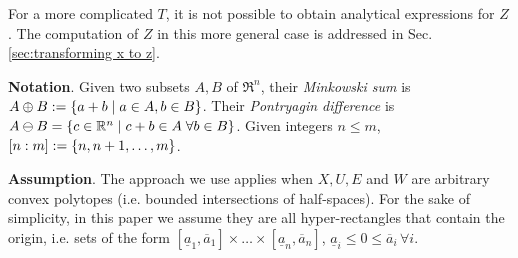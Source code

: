 For a more complicated $T$, it is not possible to obtain analytical expressions for $Z$. 
The computation of $Z$ in this more general case is addressed in Sec. \ref{sec:transforming x to z}.

\textbf{Notation}.
Given two subsets $A,B$ of $\Re^n$, their \textit{Minkowski sum} is $A\oplus B := \{a+b \;|\; a\in A, b\in B\}$.
Their \emph{Pontryagin difference} is $A\ominus B = \{c \in \mathbb{R}^n \;|\; c+b \in A\; \forall b \in B\}$.
Given integers $n \leq m$, $[n:m] := \{n,n+1,\ldots,m\}$.

\textbf{Assumption}. 
The approach we use applies when $X, U, E$ and $W$ are arbitrary convex polytopes (i.e. bounded intersections of half-spaces).
For the sake of simplicity, in this paper we assume they are all hyper-rectangles that contain the origin, i.e. sets of the form $[\underline{a}_1, \overline{a}_1] \times \ldots \times  [\underline{a}_n, \overline{a}_n]$, $\underline{a}_i \leq 0 \leq \overline{a}_i\,\forall i$.